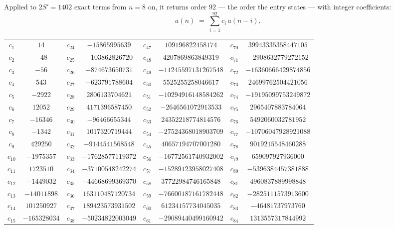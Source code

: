 \documentclass[11pt,a4paper]{article}
\theoremstyle{plain}
\theoremstyle{definition}
\begin{document}
Applied to $2S'=1402$ exact terms from $n=8$ on, it returns order $92$ --- the
order the entry states --- with integer coefficients:
\[
a(n)\;=\;\sum_{i=1}^{92}c_i\,a(n-i),
\]
\begin{center}\small
\begin{tabular}{cccccccc}
$c_{1}$ & $14$ & $c_{24}$ & $-15865995639$ & $c_{47}$ & $109196822458174$ & $c_{70}$ & $39943335358447105$ \\
$c_{2}$ & $-48$ & $c_{25}$ & $-103862826720$ & $c_{48}$ & $4207869863849319$ & $c_{71}$ & $-2908632779272152$ \\
$c_{3}$ & $-56$ & $c_{26}$ & $-874673650731$ & $c_{49}$ & $-11245597131267548$ & $c_{72}$ & $-16360666429874856$ \\
$c_{4}$ & $543$ & $c_{27}$ & $-623791788604$ & $c_{50}$ & $5525255258046617$ & $c_{73}$ & $24699762504421056$ \\
$c_{5}$ & $-2922$ & $c_{28}$ & $2806133704621$ & $c_{51}$ & $-10294916148584262$ & $c_{74}$ & $-19195099753249872$ \\
$c_{6}$ & $12052$ & $c_{29}$ & $4171396587450$ & $c_{52}$ & $-2646561072913533$ & $c_{75}$ & $2965407883784064$ \\
$c_{7}$ & $-16346$ & $c_{30}$ & $-96466655344$ & $c_{53}$ & $24352218774814576$ & $c_{76}$ & $5492060032781952$ \\
$c_{8}$ & $-1342$ & $c_{31}$ & $1017320719444$ & $c_{54}$ & $-27524368018903709$ & $c_{77}$ & $-10706047928921088$ \\
$c_{9}$ & $429250$ & $c_{32}$ & $-9144541568548$ & $c_{55}$ & $40657194707001280$ & $c_{78}$ & $9019215548460288$ \\
$c_{10}$ & $-1975357$ & $c_{33}$ & $-17628577119372$ & $c_{56}$ & $-16772561740932002$ & $c_{79}$ & $659097927936000$ \\
$c_{11}$ & $1723510$ & $c_{34}$ & $-37100548242274$ & $c_{57}$ & $-15289123958027408$ & $c_{80}$ & $-5396384457381888$ \\
$c_{12}$ & $-1449032$ & $c_{35}$ & $-44668699369370$ & $c_{58}$ & $37722984746165848$ & $c_{81}$ & $4960837889998848$ \\
$c_{13}$ & $-14011898$ & $c_{36}$ & $163110487120734$ & $c_{59}$ & $-76600187161782448$ & $c_{82}$ & $-2825111573913600$ \\
$c_{14}$ & $101250927$ & $c_{37}$ & $189423573931502$ & $c_{60}$ & $61234157734045035$ & $c_{83}$ & $-46481737973760$ \\
$c_{15}$ & $-165328034$ & $c_{38}$ & $-50234822003049$ & $c_{61}$ & $-29089440499160942$ & $c_{84}$ & $1313557317844992$ \\

\end{tabular}
\end{center}
\end{document}
